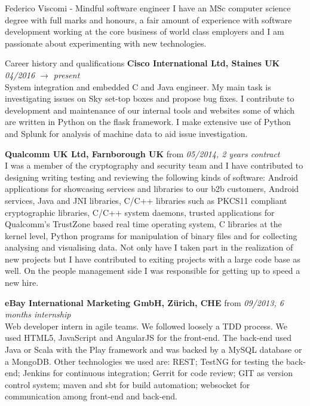 \documentclass{resume}
\begin{document}
	\begin{rSection}{Federico Viscomi - Mindful software engineer}
		I have an MSc computer science degree with full marks and honours, 
		a fair amount of experience with software development working at the core business of world class employers 
		and I am passionate about experimenting with new technologies.
	\end{rSection}
	\begin{rSection}{Career history and qualifications}
		{\bf Cisco International Ltd, Staines UK} \hfill {\em 04/2016 $\rightarrow$ present}\\
			System integration and embedded C and Java engineer. 
			My main task is investigating issues on Sky set-top boxes and propose bug fixes.
			I contribute to development and maintenance of our internal tools and websites some of which are written in Python on the flask framework.
			I make extensive use of Python and Splunk for analysis of machine data to aid issue investigation.

		{\bf Qualcomm UK Ltd, Farnborough UK} \hfill {from \em 05/2014, 2 years contract}\\
			I was a member of the cryptography and security team and I have contributed to designing writing testing and reviewing the following kinds of software:
			Android applications for showcasing services and libraries to our b2b customers,
			Android services, 
			Java and JNI libraries, 
			C/C++ libraries such as PKCS11 compliant cryptographic libraries,
			C/C++ system daemons,
			trusted applications for Qualcomm's TrustZone based real time operating system,
			C libraries at the kernel level,
			Python programs for manipulation of binary files and for collecting analysing and visualising data.	
			Not only have I taken part in the realization of new projects but I have contributed to exiting projects with a large code base as well.
			On the people management side I was responsible for getting up to speed a new hire.

		{\bf eBay International Marketing GmbH, Z\"urich, CHE} \hfill {from \em 09/2013, 6 months internship}\\
			Web developer intern in agile teams.
			We followed loosely a TDD process.
			We used HTML5, JavaScript and AngularJS for the front-end. 
			The back-end used Java or Scala with the Play framework and was backed by a MySQL database or a MongoDB. 
			Other technologies we used are: 
			REST; TestNG for testing the back-end; 
			Jenkins for continuous integration; 
			Gerrit for code review; 
			GIT as version control system; 
			maven and sbt for build automation;
			websocket for communication among front-end and back-end.	  
	    

\end{rSection}
\end{document}
